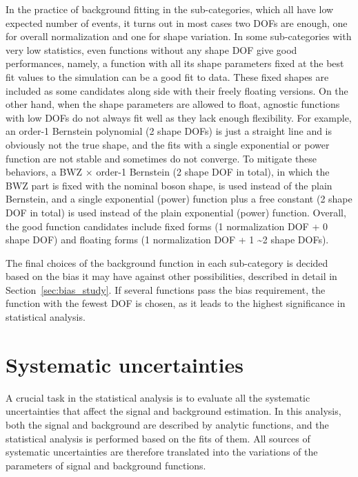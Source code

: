 In the practice of background fitting in the \VH sub-categories, which all have low expected number of events,
it turns out in most cases two DOFs are enough, one for overall normalization and one for shape variation.
In some sub-categories with very low statistics, even functions without any shape DOF give good performances,
namely, a function with all its shape parameters fixed at the best fit values to the simulation can be a good fit to data.
These fixed shapes are included as some candidates along side with their freely floating versions.
On the other hand, when the shape parameters are allowed to float, 
agnostic functions with low DOFs do not always fit well as they lack enough flexibility.
For example, an order-1 Bernstein polynomial (2 shape DOFs) is just a straight line and is obviously not the true \mmm shape,
and the fits with a single exponential or power function are not stable and sometimes do not converge.
To mitigate these behaviors, a BWZ $\times$ order-1 Bernstein (2 shape DOF in total), in which the BWZ part is fixed with the nominal \PZ boson shape, is used instead of the plain Bernstein,
and a single exponential (power) function plus a free constant (2 shape DOF in total) is used instead of the plain exponential (power) function.
Overall, the good function candidates include fixed forms (1 normalization DOF + 0 shape DOF) and 
floating forms (1 normalization DOF + 1 \sim 2 shape DOFs).

The final choices of the background function in each sub-category is decided based on 
the bias it may have against other possibilities, described in detail in Section~\ref{sec:bias_study}.
If several functions pass the bias requirement, the function with the fewest DOF is chosen, 
as it leads to the highest significance in statistical analysis.


\section{Systematic uncertainties}\label{sec:vh_systematics}

A crucial task in the statistical analysis is to evaluate all the systematic uncertainties 
that affect the signal and background estimation.
In this analysis, both the signal and background are described by analytic functions,  
and the statistical analysis is performed based on the fits of them.
All sources of systematic uncertainties are therefore translated into the 
variations of the parameters of signal and background functions.

